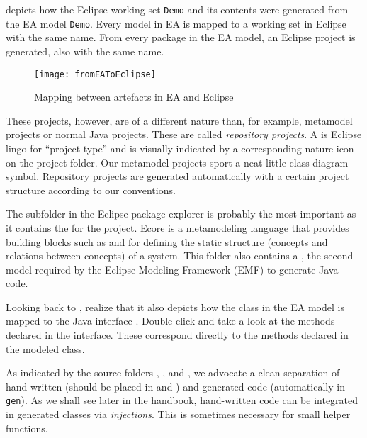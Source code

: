  depicts how the Eclipse working set \texttt{Demo} and its contents were generated from the EA model \texttt{Demo}. Every model
in EA is mapped to a working set in Eclipse with the same name. From every package in the EA model, an Eclipse project is generated, also with the same name.

\begin{figure}[htbp]
    \centering
  \texttt{[image: fromEAToEclipse]}
    \caption{Mapping between artefacts in EA and Eclipse}
    \label{fig:fromEAtoEclipse}
\end{figure}

These projects, however, are of a different nature than, for example, metamodel projects or normal Java projects.
These are called \emph{repository projects}.
A  is Eclipse lingo for \enquote{project type} and is visually indicated by a corresponding nature icon on the project folder.
Our metamodel projects sport a neat little class diagram symbol.
Repository projects are generated automatically with a certain project structure according to our conventions.

The  subfolder in the Eclipse package explorer is probably the most important as it contains the  for the project. Ecore is a metamodeling language that provides building blocks such as  and  for defining the static structure (concepts and relations between concepts) of a system.
This folder also contains a , the second model required by the Eclipse Modeling Framework (EMF) to generate Java code.

Looking back to , realize that it also depicts how the class  in the EA model is mapped to the Java interface .
Double-click  and take a look at the methods declared in the interface. These correspond directly to the methods declared in the modeled  class.

As indicated by the source folders , , and , we advocate a clean separation of hand-written (should be placed in  and ) and generated code (automatically in \texttt{gen}).
As we shall see later in the handbook, hand-written code can be
integrated in generated classes via \emph{injections}.
This is sometimes necessary for small helper functions.

